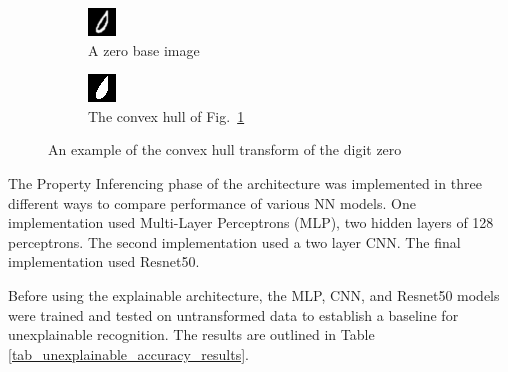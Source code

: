 \documentclass[conference]{IEEEtran}
\begin{document}
\begin{figure}[h]
    \centering
    \begin{subfigure}{.5\columnwidth}
        \centering
        \includegraphics[width=.50\textwidth]{./images/raw_0-0-12.png}
        \caption{A zero base image}
        \label{fig:zero_raw}
    \end{subfigure}%
    \begin{subfigure}{.5\columnwidth}
        \centering
        \includegraphics[width=.50\textwidth]{./images/ch_0-0-12.png}
        \caption{The convex hull of Fig.~\ref{fig:zero_raw}}
        \label{fig:zero_ch}
    \end{subfigure}
    \caption{An example of the convex hull transform of the digit zero}
    \label{fig:chull_example}
\end{figure}

The Property Inferencing phase of the architecture was implemented in three
different ways to compare performance of various NN models.  One implementation
used Multi-Layer Perceptrons (MLP), two hidden layers of 128 perceptrons.  The
second implementation used a two layer CNN.  The final implementation used
Resnet50.

Before using the explainable architecture, the MLP, CNN, and Resnet50 models were
trained and tested on untransformed data to establish a baseline for
unexplainable recognition.  The results are outlined in Table
\ref{tab_unexplainable_accuracy_results}.
\end{document}
